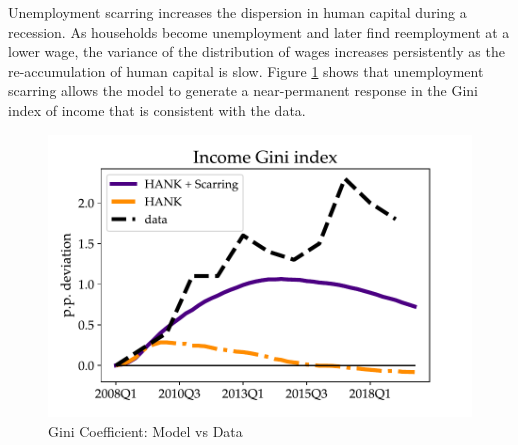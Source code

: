 Unemployment scarring increases the dispersion in human capital during a recession. As households become unemployment and later find reemployment at a lower wage, the variance of the distribution of wages increases persistently as the re-accumulation of human capital is slow.  Figure \ref{Gini_GR} shows that unemployment scarring allows the model to generate a near-permanent response in the Gini index of income that is consistent with the data. 


\begin{figure}[!ht!]
\begin{center}
\includegraphics[scale=.7]{text/chapter1/Figures/GR_sim/income_gini}
\end{center}
\caption{Gini Coefficient: Model vs Data}
 \label{Gini_GR}
\end{figure}

